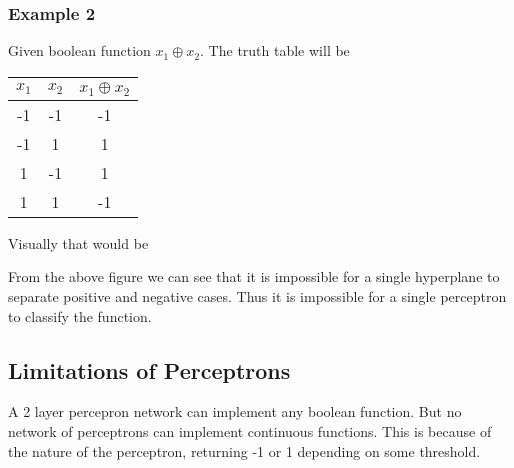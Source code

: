 \documentclass[10pt,a4paper]{article}
\begin{document}
\subsubsection{Example 2}
Given boolean function $x_1\oplus x_2$. The truth table will be

\begin{tabular}{|c|c|c|}
\hline
$x_1$ & $x_2$ & $x_1\oplus x_2$ \\
\hline
-1 & -1 & -1 \\
-1 & 1 & 1 \\
1 & -1 & 1 \\
1 & 1 & -1 \\
\hline
\end{tabular}

Visually that would be

\begin{center}
\end{center}

From the above figure we can see that it is impossible for a single hyperplane to separate positive and negative cases. Thus it is impossible for a single perceptron to classify the function.










 
\subsection{Limitations of Perceptrons}

A 2 layer percepron network can implement any boolean function. But no network of perceptrons can implement continuous functions. This is because of the nature of the perceptron, returning -1 or 1 depending on some threshold.
\end{document}
